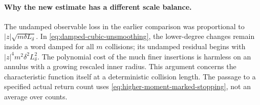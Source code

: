 \paragraph{Why the new estimate has a different scale balance.}
The undamped observable loss in the earlier comparison was proportional
to $|z|\sqrt{m\delta L_\delta}$. In
\eqref{eq:damped-cubic-unsmoothing}, the lower-degree changes remain
inside a word damped for all $m$ collisions; its undamped residual
begins with $|z|^4m^2\delta^2L_\delta^2$. The polynomial cost of
the much finer insertions is harmless on an annulus with a growing
rescaled inner radius. This argument concerns the characteristic
function itself at a deterministic collision length. The passage to a
specified actual return count uses
\eqref{eq:higher-moment-marked-stopping}, not an average over counts.
